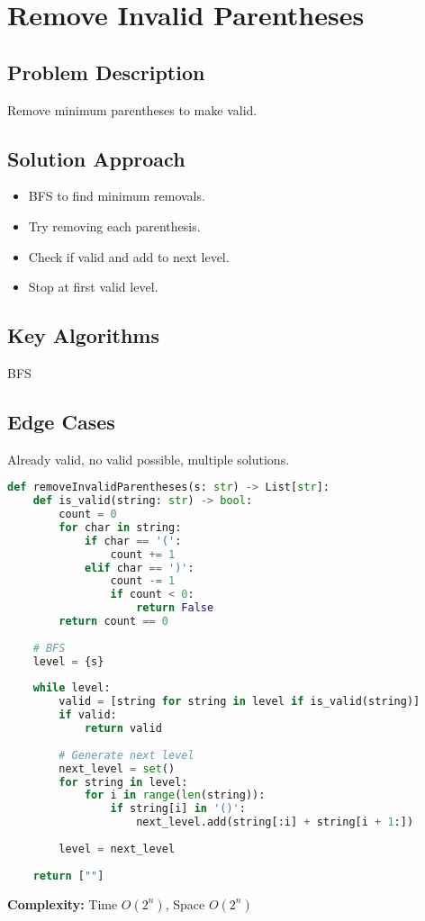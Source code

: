 \documentclass[10pt, a4paper]{article}
\begin{document}
\section{Remove Invalid Parentheses}
\subsection*{Problem Description}
Remove minimum parentheses to make valid.

\subsection*{Solution Approach}
\begin{itemize}
    \item BFS to find minimum removals.
    \item Try removing each parenthesis.
    \item Check if valid and add to next level.
    \item Stop at first valid level.
\end{itemize}

\subsection*{Key Algorithms}
BFS

\subsection*{Edge Cases}
Already valid, no valid possible, multiple solutions.

\begin{lstlisting}[language=Python]
def removeInvalidParentheses(s: str) -> List[str]:
    def is_valid(string: str) -> bool:
        count = 0
        for char in string:
            if char == '(':
                count += 1
            elif char == ')':
                count -= 1
                if count < 0:
                    return False
        return count == 0
    
    # BFS
    level = {s}
    
    while level:
        valid = [string for string in level if is_valid(string)]
        if valid:
            return valid
        
        # Generate next level
        next_level = set()
        for string in level:
            for i in range(len(string)):
                if string[i] in '()':
                    next_level.add(string[:i] + string[i + 1:])
        
        level = next_level
    
    return [""]
\end{lstlisting}
\textbf{Complexity:} Time $O(2^n)$, Space $O(2^n)$
\end{document}

